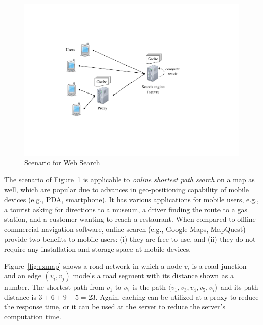 \documentclass{sig-alternate}
\begin{document}
\begin{figure}[hbt]
  \center
        \includegraphics[width=0.7\columnwidth]{figures/scenario}
        \caption{Scenario for Web Search}
  \label{fig:arch}
\end{figure}




The scenario of Figure~\ref{fig:arch} is applicable to {\em online shortest path search} on a map as well,
which are popular due to advances in geo-positioning capability of mobile devices (e.g., PDA, smartphone).
It has various applications for mobile users, e.g., a tourist asking for directions to a museum,
a driver finding the route to a gas station, and a customer wanting to reach a restaurant.
%
When compared to offline commercial navigation software, online search (e.g., Google Maps, MapQuest)
provide two benefits to mobile users:
(i) they are free to use, and
(ii) they do not require any installation and storage space at mobile devices.

Figure~\ref{fig:rxmap} shows a road network in which a node $v_i$ is a road junction
and an edge $(v_i,v_j)$ models a road segment with its distance %
shown as a number.
The shortest path from $v_1$ to $v_7$ is the path $\langle v_1, v_3, v_4, v_5, v_7 \rangle$
and its path distance is $3+6+9+5=23$.
%
Again, caching can be utilized at a proxy to reduce the response time,
or it can be used at the server to reduce the server's computation time.
\end{document}
